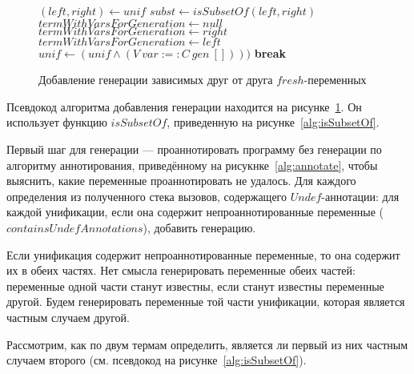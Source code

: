 \begin{figure}[h!]
  \begin{center}
  \begin{minipage}{\textwidth}
\begin{algorithm}[H]
  \begin{algorithmic}
            \State $(left, right) \gets unif$
            \State $subst \gets isSubsetOf(left, right)$
            \State $termWithVarsForGeneration \gets null$
              \State $termWithVarsForGeneration \gets right$
            \Else
              \State $termWithVarsForGeneration \gets left$
            \EndIf
          \EndIf
              \State  $unif \gets (unif \wedge (V \ var :=: C \ gen \ [])))$
            \EndIf
          \EndFor
          \State \textbf{break}
        \EndFor
      \EndFor
    \EndFunction
  \end{algorithmic}
\end{algorithm}
  \end{minipage}
  \end{center}
  \caption{Добавление генерации зависимых друг от друга $fresh$-переменных}
  \label{alg:addGeneration}
\end{figure}

Псевдокод алгоритма добавления генерации находится на рисунке~\ref{alg:addGeneration}.
Он использует функцию $isSubsetOf$, приведенную на рисунке~\ref{alg:isSubsetOf}.

Первый шаг для генерации --- проаннотировать программу без генерации по алгоритму аннотирования, приведённому на рисукнке~\ref{alg:annotate}, чтобы выяснить, какие переменные проаннотировать не удалось.
Для каждого определения из полученного стека вызовов, содержащего $Undef$-аннотации: для каждой унификации, если она содержит непроаннотированные переменные ($containsUndefAnnotations$), добавить генерацию.

Если унификация содержит непроаннотированные переменные, то она содержит их в обеих частях.
Нет смысла генерировать переменные обеих частей: переменные одной части станут известны, если станут известны переменные другой.
Будем генерировать переменные той части унификации, которая является частным случаем другой.

Рассмотрим, как по двум термам определить, является ли первый из них частным случаем второго (см. псевдокод на рисунке~\ref{alg:isSubsetOf}).

